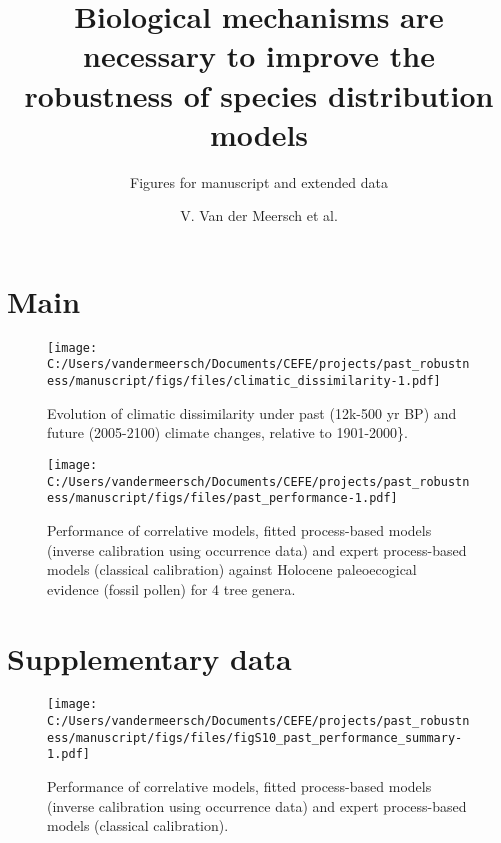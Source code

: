 \documentclass[
]{article}
\title{Biological mechanisms are necessary to improve the robustness of
species distribution models}
\subtitle{Figures for manuscript and extended data}
\author{V. Van der Meersch et al.}
\date{}
\begin{document}
\maketitle

\hypertarget{main}{%
\section{Main}\label{main}}

\begin{figure}
\centering
\texttt{[image: C:/Users/vandermeersch/Documents/CEFE/projects/past\_robustness/manuscript/figs/files/climatic\_dissimilarity-1.pdf]}
\caption{Evolution of climatic dissimilarity under past (12k-500 yr BP)
and future (2005-2100) climate changes, relative to 1901-2000\}.}
\end{figure}

\newpage

\newpage

\begin{figure}
\centering
\texttt{[image: C:/Users/vandermeersch/Documents/CEFE/projects/past\_robustness/manuscript/figs/files/past\_performance-1.pdf]}
\caption{Performance of correlative models, fitted process-based models
(inverse calibration using occurrence data) and expert process-based
models (classical calibration) against Holocene paleoecogical evidence
(fossil pollen) for 4 tree genera.}
\end{figure}

\newpage

\hypertarget{supplementary-data}{%
\section{Supplementary data}\label{supplementary-data}}

\renewcommand{\thefigure}{S\arabic{figure}}
\setcounter{figure}{0}

\begin{figure}
\centering
\texttt{[image: C:/Users/vandermeersch/Documents/CEFE/projects/past\_robustness/manuscript/figs/files/figS10\_past\_performance\_summary-1.pdf]}
\caption{Performance of correlative models, fitted process-based models
(inverse calibration using occurrence data) and expert process-based
models (classical calibration).}
\end{figure}
\end{document}
